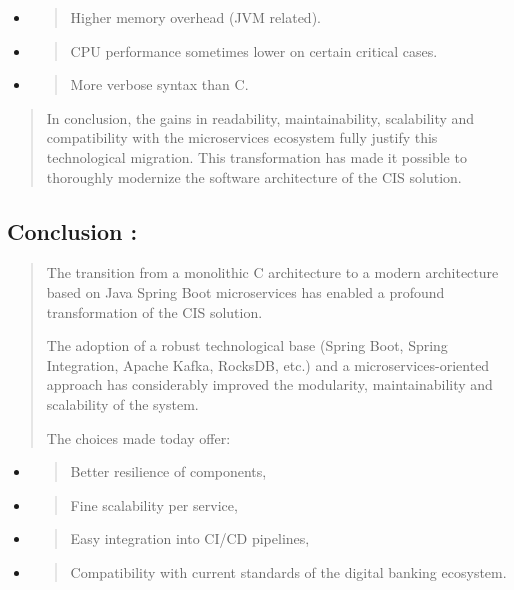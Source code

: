 \documentclass[12pt,a4paper]{report}
\begin{document}
\begin{itemize}
\item
  \begin{quote}
  Higher memory overhead (JVM related).
  \end{quote}
\item
  \begin{quote}
  CPU performance sometimes lower on certain critical cases.
  \end{quote}
\item
  \begin{quote}
  More verbose syntax than C.
  \end{quote}
\end{itemize}

\begin{quote}
In conclusion, the gains in readability, maintainability, scalability
and compatibility with the microservices ecosystem fully justify this
technological migration. This transformation has made it possible to
thoroughly modernize the software architecture of the CIS solution.
\end{quote}

\hypertarget{conclusion-4}{%
\subsection{\texorpdfstring{\textbf{Conclusion
:}}{Conclusion :}}\label{conclusion-4}}

\begin{quote}
The transition from a monolithic C architecture to a modern architecture
based on Java Spring Boot microservices has enabled a profound
transformation of the CIS solution.

The adoption of a robust technological base (Spring Boot, Spring
Integration, Apache Kafka, RocksDB, etc.) and a microservices-oriented
approach has considerably improved the modularity, maintainability and
scalability of the system.

The choices made today offer:
\end{quote}

\begin{itemize}
\item
  \begin{quote}
  Better resilience of components,
  \end{quote}
\item
  \begin{quote}
  Fine scalability per service,
  \end{quote}
\item
  \begin{quote}
  Easy integration into CI/CD pipelines,
  \end{quote}
\item
  \begin{quote}
  Compatibility with current standards of the digital banking ecosystem.
  \end{quote}
\end{itemize}
\end{document}
